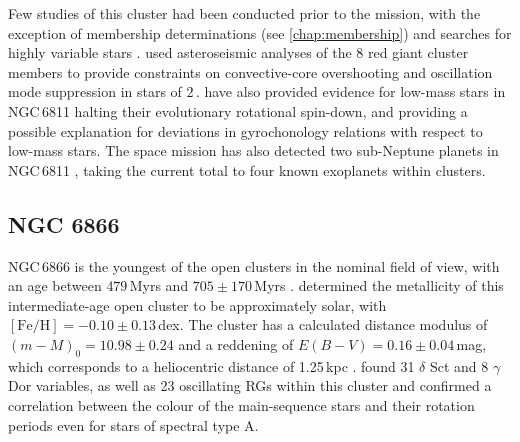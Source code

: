 Few studies of this cluster had been conducted prior to the \Kepler{} mission, with the exception of membership determinations (see \cref{chap:membership}) and searches for highly variable stars \citep{van_cauteren_search_2005, luo_variable_2009}. \cite{arentoft_convective-core_2017} used asteroseismic analyses of the 8 red giant cluster members to provide constraints on convective-core overshooting and oscillation mode suppression in stars of $2$\,\Msol{}. \cite{curtis_temporary_2019} have also provided evidence for low-mass stars in NGC\,6811 halting their evolutionary rotational spin-down, and providing a possible explanation for deviations in gyrochonology relations with respect to low-mass stars. The \Kepler{} space mission has also detected two sub-Neptune planets in NGC\,6811 \citep{meibom_same_2013}, taking the current total to four known exoplanets within clusters.

\subsection{NGC 6866}

NGC\,6866 is the youngest of the open clusters in the nominal \Kepler{} field of view, with an age between $479$\,Myrs and $705 \pm 170$\,Myrs \citep{janes_open_2014, gunes_astrophysical_2012}. \cite{bostanci_comprehensive_2015} determined the metallicity of this intermediate-age open cluster to be approximately solar, with $[\mathrm{Fe/H}] = -0.10 \pm 0.13$\,dex. The cluster has a calculated distance modulus of $(m-M)_0 = 10.98 \pm 0.24$ and a reddening of $E(B-V) = 0.16 \pm 0.04$\,mag, which corresponds to a heliocentric distance of 1.25\,kpc \citep{janes_open_2014}. \cite{balona_pulsation_2013} found 31 $\delta$ Sct and 8 $\gamma$ Dor variables, as well as 23 oscillating RGs within this cluster and confirmed a  correlation between the colour of the main-sequence stars and their rotation periods even for stars of spectral type A.



